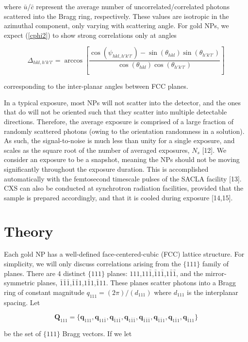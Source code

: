 \documentclass [11pt,fleqn]{article}
\def \be {\begin{equation}}
\def \ee {\end{equation}}
\begin{document}
where $\bar{u}$/$\bar{c}$ represent the average number of uncorrelated/correlated photons scattered into the Bragg ring, respectively. These values are isotropic in the azimuthal component, only varying with scattering angle. For gold NPs, we expect (\ref{cphi2}) to show strong correlations only at angles 

\be
\Delta_{hkl,h'k'l'} = \arccos\left [  \frac{ \cos(\psi_{hkl,h'k'l'}) - \sin(\theta_{hkl})\sin(\theta_{h'k'l'} ) }{ \cos(\theta_{hkl})\cos(\theta_{h'k'l'} ) } \right ] 
\ee

corresponding to the inter-planar angles between FCC planes.

In a typical exposure, most NPs will not scatter into the detector, and the ones that do will not be oriented such that they scatter into multiple detectable directions. Therefore, the average exposure is comprised of a large fraction of randomly scattered photons (owing to the orientation randomness in  a solution). As such, the signal-to-noise is much less than unity for a single exposure, and scales as the square root of the number of averaged exposures, $N_s$ [12]. We consider an exposure to be a snapshot, meaning the NPs should not be moving significantly throughout the exposure duration. This is accomplished automatically with the femtosecond timescale pulses of the SACLA facility [13].  CXS can also be conducted at synchrotron radiation facilities, provided  that the sample is prepared accordingly, and that it is cooled during exposure [14,15]. 

\section{Theory}
Each gold NP has a well-defined face-centered-cubic (FCC) lattice structure. For simplicity, we will only discuss correlations arising from the $\{111\}$ family of planes. There are 4 distinct $\{111\}$ planes: $111$,$11\bar 1$,$\bar 1 1\bar 1$,$1\bar 1 \bar 1$, and the mirror-symmetric planes, $\bar 1\bar 1\bar 1$,$\bar 1\bar 1 1$,$1 \bar 11$,$\bar 1 1 1$.  These planes scatter photons into a Bragg ring of constant magnitude $q_{111} = ( 2\pi ) / ( d_{111} )$ where $d_{111}$ is the interplanar spacing.  Let 

\be
\bm Q_{111} = \{\bm q_{111}, \bm q_{11\bar 1},\bm q_{\bar 1 1\bar 1},\bm q_{1\bar 1 \bar 1},\bm q_{\bar 1\bar 1\bar 1},\bm q_{\bar 1\bar 1 1},\bm q_{1 \bar 11},\bm q_{\bar 1 1 1}\}
\ee

 be the set of $\{111\}$ Bragg vectors. If we let 
\end{document}
